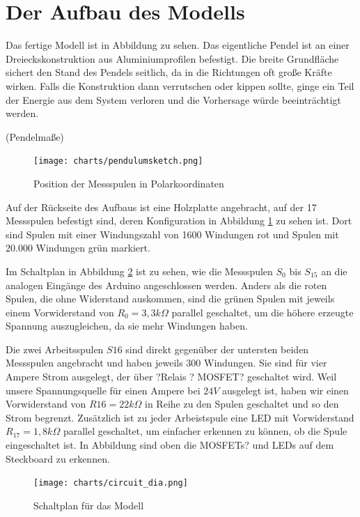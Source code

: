 
\section{Der Aufbau des Modells}
Das fertige Modell ist in Abbildung \TODO zu sehen.
Das eigentliche Pendel ist an einer Dreieckskonstruktion aus Aluminiumprofilen befestigt.
Die breite Grundfläche sichert den Stand des Pendels seitlich, da in die Richtungen oft große Kräfte wirken.
Falls die Konstruktion dann verrutschen oder kippen sollte, ginge ein Teil der Energie aus dem System verloren und die Vorhersage würde beeinträchtigt werden.

(\TODO Pendelmaße)

\begin{figure}[bht]
  \texttt{[image: charts/pendulumsketch.png]}
  \caption{Position der Messspulen in Polarkoordinaten}
  \label{fig:pendulumsketch}
\end{figure}

Auf der Rückseite des Aufbaus ist eine Holzplatte angebracht, auf der 17 Messspulen befestigt sind, deren Konfiguration in Abbildung \ref{fig:pendulumsketch} zu sehen ist.
Dort sind Spulen mit einer Windungszahl von 1600 Windungen rot und Spulen mit 20.000 Windungen grün markiert.

Im Schaltplan in Abbildung \ref{fig:circuit} ist zu sehen, wie die Messspulen $S_0$ bis $S_{15}$ an die analogen Eingänge des Arduino angeschlossen werden.
Anders als die roten Spulen, die ohne Widerstand auskommen, sind die grünen Spulen mit jeweils einem Vorwiderstand von $R_0 = 3,3 k\Omega$ parallel geschaltet, um die höhere erzeugte Spannung auszugleichen, da sie mehr Windungen haben.

Die zwei Arbeitsspulen $S16$ sind direkt gegenüber der untersten beiden Messspulen angebracht und haben jeweils 300 Windungen.
Sie sind für vier Ampere Strom ausgelegt, der über \TODO ?Relais ? MOSFET? geschaltet wird.
Weil unsere Spannungsquelle für einen Ampere bei $24 V$ ausgelegt ist, haben wir einen Vorwiderstand von $R16 = 22 k\Omega$ in Reihe zu den Spulen geschaltet und so den Strom begrenzt.
Zusätzlich ist zu jeder Arbeistspule eine LED mit Vorwiderstand $R_{17} = 1,8 k\Omega$ parallel geschaltet, um einfacher erkennen zu können, ob die Spule eingeschaltet ist. In Abbildung \TODO sind oben die \TODO MOSFETs? und LEDs auf dem Steckboard zu erkennen.

\begin{figure}[bht]
  \texttt{[image: charts/circuit\_dia.png]}
  \caption{Schaltplan für das Modell}
  \label{fig:circuit}
\end{figure}

